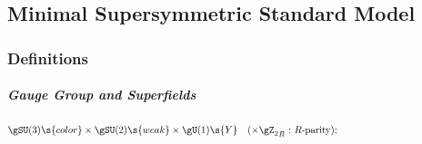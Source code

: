 
\def\uL{u\s L{}}%
\def\dL{d\s L{}}
\def\eL{e\s L{}}
\def\eR{e\s R{}}
\def\uR{u\s R{}}
\def\dR{d\s R{}}

\def\bQ{{\bar Q}}
\def\bL{{\bar L}}
\def\bU{{\bar U}}
\def\bD{{\bar D}}
\def\bE{{\bar E}}


\newcommand\sqL{\tilde q}    \newcommand\slL{\tilde l}    \newcommand\suR{\tilde u\s R}
\newcommand\suL{\tilde u\s L}\newcommand\snu{\tilde \nu}  \newcommand\sdR{\tilde d\s R}
\newcommand\sdL{\tilde d\s L}\newcommand\seL{\tilde e\s L}\newcommand\seR{\tilde e\s R}
\renewcommand\Hu {H\s u}    \renewcommand\Hd {H\s d}
\renewcommand\HuP{H\s u^+{}}\renewcommand\HdZ{H\s d^0{}}
\renewcommand\HuZ{H\s u^0{}}\renewcommand\HdM{H\s d^-{}}

\newcommand\Uc{U\suprm c}\newcommand\bUc{\bar U\suprm c}
\newcommand\Dc{D\suprm c}\newcommand\bDc{\bar D\suprm c}
\newcommand\Ec{E\suprm c}\newcommand\bEc{\bar E\suprm c}

\newcommand\Hnou{\tilde h\s u}     \newcommand\Hnod{\tilde h\s d}     \newcommand\bno{\tilde b}
\newcommand\HnouP{\tilde h\s u^+{}}\newcommand\HnodZ{\tilde h\s d^0{}}\newcommand\wno{\tilde w}
\newcommand\HnouZ{\tilde h\s u^0{}}\newcommand\HnodM{\tilde h\s d^-{}}\newcommand\gno{\tilde g}
\newcommand\bHnou{\bar{\tilde h}\s u{}}   \newcommand\bHnod{\bar{\tilde h}\s d{}}   \newcommand\bbno{\bar{\tilde b}{}}
\newcommand\bHnouP{\bar{\tilde h}{}\s u^+}\newcommand\bHnodZ{\bar{\tilde h}{}\s d^0}\newcommand\bwno{\bar{\tilde w}{}}
\newcommand\bHnouZ{\bar{\tilde h}{}\s u^0}\newcommand\bHnodM{\bar{\tilde h}{}\s d^-}\newcommand\bgno{\bar{\tilde g}{}}

\subsection{Minimal Supersymmetric Standard Model}
\subsubsection{Definitions}
\subparagraph[Gauge Group and Superfields]{Gauge Group and Superfields\footnotemark}
\begin{equation}
\gSU(3)\s{color}\times\gSU(2)\s{weak}\times\gU(1)\s{Y}\quad(\times{\gZ_2}_R\text{\ :\ $R$-parity});
\hspace{130pt}
\end{equation}

\vspace{-23pt}

